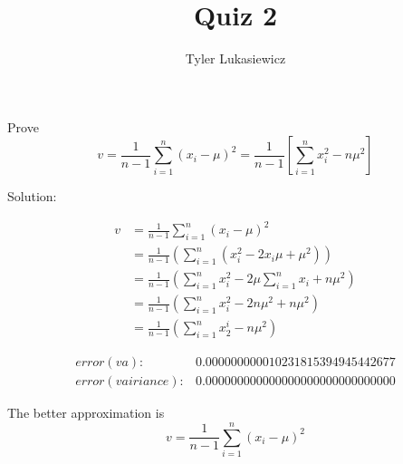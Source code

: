 \documentclass{article}
\title{Quiz 2}
\author{Tyler Lukasiewicz}
\begin{document}
\maketitle

Prove 
\begin{equation}
    v = \frac{1}{n-1} \sum_{i =1}^n (x_i - \mu)^2 = \frac{1}{n-1} \left[\sum_{i = 1}^n x_i ^2 -n \mu ^2\right]
\end{equation}

Solution:

\begin{align*}
    v &= \frac{1}{n-1} \sum_{i =1}^n (x_i - \mu)^2 \\
    &= \frac{1}{n-1}(\sum_{i=1}^n (x_i^2 - 2 x_i \mu  + \mu ^2)) \\
    &= \frac{1}{n-1} (\sum_{i=1}^n x_i^2 - 2 \mu \sum_{i=1}^n x_i + n \mu^2) \\
    &=  \frac{1}{n-1} (\sum_{i=1}^n x_i^2  - 2 n \mu ^2 + n \mu ^2) \\
    &= \frac{1}{n-1}(\sum_{i=1}^n x_2^i - n \mu ^2)
\end{align*}

\begin{align*}
    error(va): &0.000000000010231815394945442677 \\
    error(vairiance): &0.000000000000000000000000000000
\end{align*}


The better approximation is
\begin{equation*}
     v = \frac{1}{n-1} \sum_{i =1}^n (x_i - \mu)^2 
\end{equation*}
\end{document}
